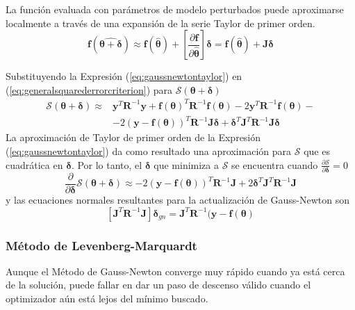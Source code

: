 La función evaluada con parámetros de modelo perturbados puede aproximarse localmente a través de una expansión de la serie Taylor de primer orden.
\begin{equation}
    \bm{f}(\hat{\bm{\theta}+\bm{\delta}}) \approx \bm{f}(\hat{\bm{\theta}}) + \left[\frac{\partial \bm{f}}{\partial \hat{\bm{\theta}}}\right]\bm{\delta} = \bm{f}(\hat{\bm{\theta}}) + \bm{J}\bm{\delta}
    \label{eq:gaussnewtontaylor}
\end{equation}

Substituyendo la Expresión (\ref{eq:gaussnewtontaylor}) en (\ref{eq:generalsquarederrorcriterion}) para $\mathscr{S}(\bm{\theta} + \bm{\delta})$
\begin{equation}
    \begin{aligned}
        \mathscr{S}(\bm{\theta}+\bm{\delta}) \approx{} &\bm{y}^T\bm{R}^{-1}\bm{y} + \bm{f}(\bm{\theta})^T\bm{R}^{-1}\bm{f}(\bm{\theta}) - 2\bm{y}^T\bm{R}^{-1}\bm{f}(\bm{\theta}) - \\
        & -2\left(\bm{y} - \bm{f}(\bm{\theta})\right)^T\bm{R}^{-1}\bm{J}\bm{\delta} + \bm{\delta}^T\bm{J}^T\bm{R}^{-1}\bm{J}\bm{\delta}
    \end{aligned}
\end{equation}
La aproximación de Taylor de primer orden  de la Expresión (\ref{eq:gaussnewtontaylor}) da como resultado una aproximación para $\mathscr{S}$ que es cuadrática en $\bm{\delta}$. Por lo tanto, el $\bm{\delta}$ que minimiza a $\mathscr{S}$ se encuentra cuando $\frac{\partial \mathscr{S}}{\partial \bm{\delta}} = 0$
\begin{equation}
    \frac{\partial}{\partial \bm{\delta}}\mathscr{S}(\bm{\theta} + \bm{\delta}) \approx -2\left(\bm{y} - \bm{f}(\bm{\theta})\right)^T\bm{R}^{-1}\bm{J} + 2\bm{\delta}^T\bm{J}^T\bm{R}^{-1}\bm{J}
\end{equation}
y las ecuaciones normales resultantes para la actualización de Gauss-Newton son
\begin{equation}
    \left[\bm{J}^T\bm{R}^{-1}\bm{J}\right]\bm{\delta}_{gn} = \bm{J}^T\bm{R}^{-1}(\bm{y} - \bm{f}(\bm{\theta})
\end{equation}

\subsubsection{Método de Levenberg-Marquardt}
Aunque el Método de Gauss-Newton converge muy rápido cuando ya está cerca de la solución, puede fallar en dar un paso de descenso válido cuando el optimizador aún está lejos del mínimo buscado.

